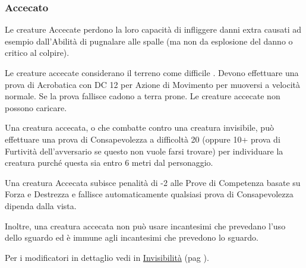 \begin{multicols}{2}
\subsubsection{Accecato}

\label{accecato}

Le creature Accecate perdono la loro capacità di infliggere danni extra causati ad esempio dall'Abilità di pugnalare alle spalle (ma non da esplosione del danno o critico al colpire).

Le creature accecate considerano il terreno come difficile . Devono effettuare una prova di Acrobatica con DC 12 per Azione di Movimento per muoversi a velocità normale. Se la prova fallisce cadono a terra prone. Le creature accecate non possono caricare.

Una creatura accecata, o che combatte contro una creatura invisibile, può effettuare una prova di Consapevolezza a difficoltà 20 (oppure 10+ prova di Furtività dell'avversario se questo non vuole farsi trovare) per individuare la creatura purché questa sia entro 6 metri dal personaggio.

Una creatura Accecata subisce penalità di -2 alle Prove di Competenza basate su Forza e Destrezza e fallisce automaticamente qualsiasi prova di Consapevolezza dipenda dalla vista.

Inoltre, una creatura accecata non può usare incantesimi che prevedano l'uso dello sguardo ed è immune agli incantesimi che prevedono lo sguardo.

Per i modificatori in dettaglio vedi in \hyperlink{invisibilita}{Invisibilità} (pag \pageref{invisibilita}).



\end{multicols}
